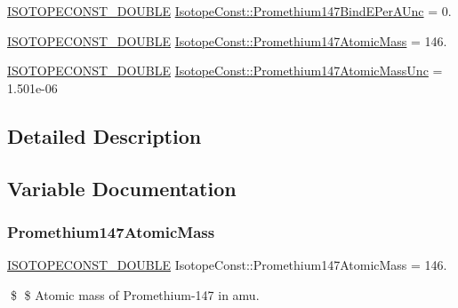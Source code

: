 \begin{DoxyCompactItemize}
\mbox{\hyperlink{group___isotope_const-_macros_ga8f45a7272ce02c0b4c65c44636ed719a}{I\+S\+O\+T\+O\+P\+E\+C\+O\+N\+S\+T\+\_\+\+D\+O\+U\+B\+LE}} \mbox{\hyperlink{group___isotope_const-_promethium-_pm147_gae2b5a4d2469e50b5bfe91a53ff00a944}{Isotope\+Const\+::\+Promethium147\+Bind\+E\+Per\+A\+Unc}} = 0.
\item 
\mbox{\hyperlink{group___isotope_const-_macros_ga8f45a7272ce02c0b4c65c44636ed719a}{I\+S\+O\+T\+O\+P\+E\+C\+O\+N\+S\+T\+\_\+\+D\+O\+U\+B\+LE}} \mbox{\hyperlink{group___isotope_const-_promethium-_pm147_ga472a05e5cfa112c0e3fc05c13422fc2c}{Isotope\+Const\+::\+Promethium147\+Atomic\+Mass}} = 146.
\item 
\mbox{\hyperlink{group___isotope_const-_macros_ga8f45a7272ce02c0b4c65c44636ed719a}{I\+S\+O\+T\+O\+P\+E\+C\+O\+N\+S\+T\+\_\+\+D\+O\+U\+B\+LE}} \mbox{\hyperlink{group___isotope_const-_promethium-_pm147_ga72dafb076a8bdbd94476b423c3a7a452}{Isotope\+Const\+::\+Promethium147\+Atomic\+Mass\+Unc}} = 1.\+501e-\/06
\end{DoxyCompactItemize}


\subsection{Detailed Description}


\subsection{Variable Documentation}
\mbox{\label{group___isotope_const-_promethium-_pm147_ga472a05e5cfa112c0e3fc05c13422fc2c}} 
\subsubsection{\texorpdfstring{Promethium147\+Atomic\+Mass}{Promethium147AtomicMass}}
{\footnotesize\ttfamily \mbox{\hyperlink{group___isotope_const-_macros_ga8f45a7272ce02c0b4c65c44636ed719a}{I\+S\+O\+T\+O\+P\+E\+C\+O\+N\+S\+T\+\_\+\+D\+O\+U\+B\+LE}} Isotope\+Const\+::\+Promethium147\+Atomic\+Mass = 146.}

\$ \$ Atomic mass of Promethium-\/147 in amu. \mbox{\label{group___isotope_const-_promethium-_pm147_ga72dafb076a8bdbd94476b423c3a7a452}} 
